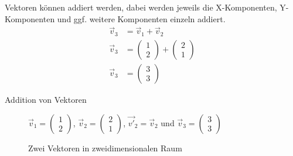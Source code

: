 \documentclass[a4paper, 10pt]{scrartcl}
\begin{document}
Vektoren können addiert werden, dabei werden jeweils die X-Komponenten, Y-Komponenten und ggf. weitere Komponenten einzeln addiert.
\begin{align}
  \vec{v}_3 &= \vec{v}_1 + \vec{v}_2\\
  \vec{v}_3 &= \left(\begin{array}{c} 1 \\ 2 \end{array}\right) + \left(\begin{array}{c} 2 \\ 1 \end{array}\right)\\
  \vec{v}_3 &= \left(\begin{array}{c} 3 \\ 3 \end{array}\right)
\end{align}

\begin{frame}{Addition von Vektoren}
  \begin{figure}[htb]

    $\vec{v}_1= \left(\begin{array}{c} 1 \\ 2 \end{array}\right)$, $\vec{v}_2= \left(\begin{array}{c} 2 \\ 1 \end{array}\right)$, $\vec{v'}_2 = \vec{v}_2$  und $\vec{v}_3= \left(\begin{array}{c} 3 \\ 3 \end{array}\right)$
    \caption{Zwei Vektoren in zweidimensionalen Raum}
    \label{fig:ZweiVektorenAddiert}
  \end{figure}
\end{frame}

\end{document}
